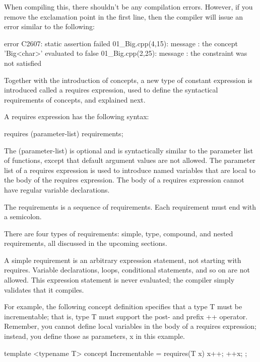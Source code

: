 When compiling this, there shouldn’t be any compilation errors. However, if you remove the exclamation point in the first line, then the compiler will issue an error similar to the following:

\begin{shell}
error C2607: static assertion failed
01_Big.cpp(4,15): message : the concept 'Big<char>' evaluated to false
01_Big.cpp(2,25): message : the constraint was not satisfied
\end{shell}

Together with the introduction of concepts, a new type of constant expression is introduced called a requires expression, used to define the syntactical requirements of concepts, and explained next.


A requires expression has the following syntax:

\begin{cpp}
requires (parameter-list) { requirements; }
\end{cpp}

The (parameter-list) is optional and is syntactically similar to the parameter list of functions, except that default argument values are not allowed. The parameter list of a requires expression is used to introduce named variables that are local to the body of the requires expression. The body of a requires expression cannot have regular variable declarations.

The requirements is a sequence of requirements. Each requirement must end with a semicolon.

There are four types of requirements: simple, type, compound, and nested requirements, all discussed in the upcoming sections.


A simple requirement is an arbitrary expression statement, not starting with requires. Variable declarations, loops, conditional statements, and so on are not allowed. This expression statement is never evaluated; the compiler simply validates that it compiles.

For example, the following concept definition specifies that a type T must be incrementable; that is, type T must support the post- and prefix ++ operator. Remember, you cannot define local variables in the body of a requires expression; instead, you define those as parameters, x in this example.

\begin{cpp}
template <typename T>
concept Incrementable = requires(T x) { x++; ++x; };
\end{cpp}

